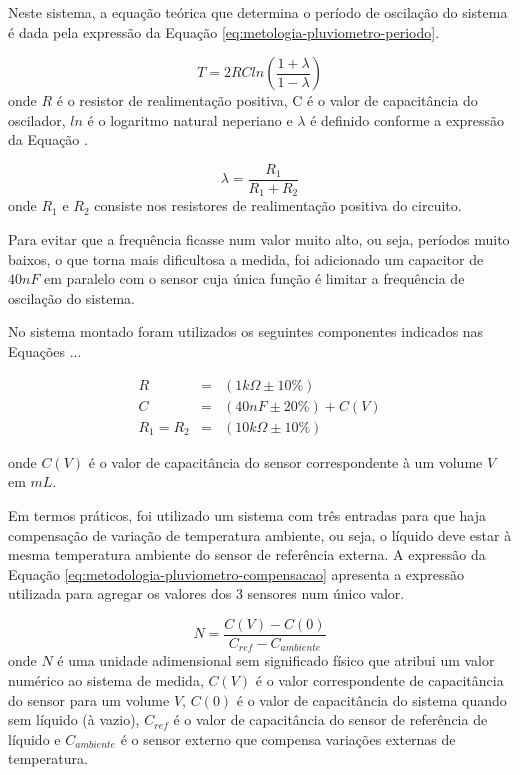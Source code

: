 \documentclass[a4paper]{instrumentacao}
\begin{document}
Neste sistema, a equação teórica que determina o período de oscilação do sistema é dada pela expressão da Equação \ref{eq:metologia-pluviometro-periodo}.

\begin{equation}
	T = 2 R C ln \left(\frac{1+\lambda}{1-\lambda}\right)
	\label{eq:metologia-pluviometro-periodo}
\end{equation}
\noindent onde $R$ é o resistor de realimentação positiva, C é o valor de capacitância do oscilador, $ln$ é o logaritmo natural neperiano e $\lambda$ é definido conforme a expressão da Equação \label{eq:metologia-pluviometro-periodo-2}.

\begin{equation}
	\lambda = \frac{R_1}{R_1 + R_2}
	\label{eq:metologia-pluviometro-periodo-2}
\end{equation}
\noindent onde $R_1$ e $R_2$ consiste nos resistores de realimentação positiva do circuito.

Para evitar que a frequência ficasse num valor muito alto, ou seja, períodos muito baixos, o que torna mais dificultosa a medida, foi adicionado um capacitor de $40 nF$ em paralelo com o sensor cuja única função é limitar a frequência de oscilação do sistema.

No sistema montado foram utilizados os seguintes componentes indicados nas Equações ...

\begin{eqnarray}
	R &=& (1 k\Omega \pm 10\%)							\\
	C &=& (40 nF \pm 20\%) + C(V) 				\\
	R_1 = R_2 &=& (10 k\Omega \pm 10\%)
\end{eqnarray}

\noindent onde $C(V)$ é o valor de capacitância do sensor correspondente à um volume $V$ em $mL$.

Em termos práticos, foi utilizado um sistema com três entradas para que haja compensação de variação de temperatura ambiente, ou seja, o líquido deve estar à mesma temperatura ambiente do sensor de referência externa. A expressão da Equação \ref{eq:metodologia-pluviometro-compensacao} apresenta a expressão utilizada para agregar os valores dos 3 sensores num único valor.

\begin{equation}
	N = \frac{C(V) - C(0)}{C_{ref} - C_{ambiente}}
	\label{eq:metodologia-pluviometro-compensacao}
\end{equation}
\noindent onde $N$ é uma unidade adimensional sem significado físico que atribui um valor numérico ao sistema de medida, $C(V)$ é o valor correspondente de capacitância do sensor para um volume $V$, $C(0)$ é o valor de capacitância do sistema quando sem líquido (à vazio), $C_{ref}$ é o valor de capacitância do sensor de referência de líquido e $C_{ambiente}$ é o sensor externo que compensa variações externas de temperatura.
\end{document}
